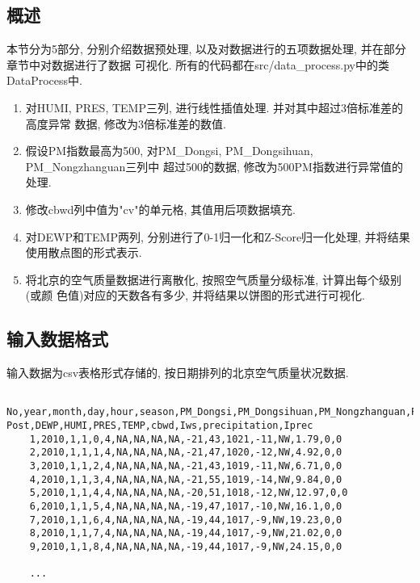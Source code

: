 \subsection{概述}
本节分为5部分, 分别介绍数据预处理, 以及对数据进行的五项数据处理, 并在部分章节中对数据进行了数据
可视化. 所有的代码都在src/data\_process.py中的类DataProcess中.
\begin{enumerate}
    \item 对HUMI, PRES, TEMP三列, 进行线性插值处理. 并对其中超过3倍标准差的高度异常
          数据, 修改为3倍标准差的数值.
    \item 假设PM指数最高为500, 对PM\_Dongsi, PM\_Dongsihuan, PM\_Nongzhanguan三列中
          超过500的数据, 修改为500PM指数进行异常值的处理.
    \item 修改cbwd列中值为"cv"的单元格, 其值用后项数据填充.
    \item 对DEWP和TEMP两列, 分别进行了0-1归一化和Z-Score归一化处理, 并将结果使用散点图的形式表示.
    \item 将北京的空气质量数据进行离散化, 按照空气质量分级标准, 计算出每个级别(或颜
          色值)对应的天数各有多少, 并将结果以饼图的形式进行可视化.
\end{enumerate}

\subsection{输入数据格式}
输入数据为csv表格形式存储的, 按日期排列的北京空气质量状况数据.
\begin{lstlisting}
    No,year,month,day,hour,season,PM_Dongsi,PM_Dongsihuan,PM_Nongzhanguan,PM_US Post,DEWP,HUMI,PRES,TEMP,cbwd,Iws,precipitation,Iprec
    1,2010,1,1,0,4,NA,NA,NA,NA,-21,43,1021,-11,NW,1.79,0,0
    2,2010,1,1,1,4,NA,NA,NA,NA,-21,47,1020,-12,NW,4.92,0,0
    3,2010,1,1,2,4,NA,NA,NA,NA,-21,43,1019,-11,NW,6.71,0,0
    4,2010,1,1,3,4,NA,NA,NA,NA,-21,55,1019,-14,NW,9.84,0,0
    5,2010,1,1,4,4,NA,NA,NA,NA,-20,51,1018,-12,NW,12.97,0,0
    6,2010,1,1,5,4,NA,NA,NA,NA,-19,47,1017,-10,NW,16.1,0,0
    7,2010,1,1,6,4,NA,NA,NA,NA,-19,44,1017,-9,NW,19.23,0,0
    8,2010,1,1,7,4,NA,NA,NA,NA,-19,44,1017,-9,NW,21.02,0,0
    9,2010,1,1,8,4,NA,NA,NA,NA,-19,44,1017,-9,NW,24.15,0,0
    
    ...
\end{lstlisting}


